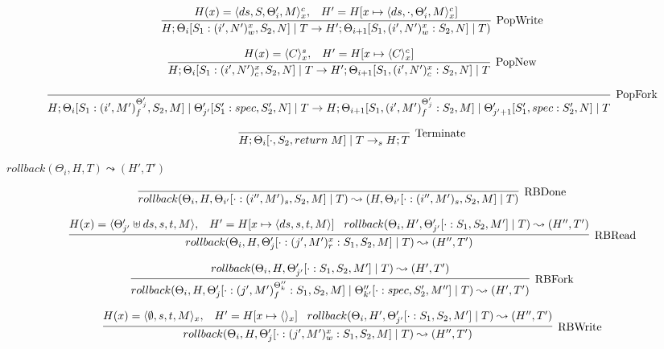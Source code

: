 \documentclass[9pt]{article}
\newcommand\specStep{\rightarrow_{s}}
\begin{document}
\[%
\infer[\text{PopWrite}]{H; \Theta_i[S_1: (i', N')_w^x, S_2, N] \; | \; T \rightarrow H'; \Theta_{i+1}[S_1, (i', N')_w^x : S_2, N] \; | \; T)}{H(x) = \langle ds, S, \Theta_i', M\rangle_x^c, \;\;\; H' = H[x \mapsto \langle ds, \cdot, \Theta_i', M\rangle_x^c]}
\]

\[%
\infer[\text{PopNew}]{H; \Theta_i[S_1 : (i', N')_c^x, S_2, N] \; | \; T \rightarrow H';  \Theta_{i+1}[S_1, (i', N')_c^x : S_2, N] \; | \; T}{H(x) = \langle C \rangle_x^s, \;\;\; H' = H[x \mapsto \langle C\rangle_x^c]}
\]

\[%
\infer[\text{PopFork}]{H; \Theta_i[S_1 : (i', M')_f^{\Theta_j'}, S_2, M] \; | \; \Theta_{j'}'[S_1' : spec, S_2', N] \; | \; T \rightarrow H; \Theta_{i+1}[S_1, (i', M')_f^{\Theta_j'} : S_2, M] \; | \; \Theta_{j' + 1}'[S_1', spec : S_2', N] \; | \; T}{}
\]

\[
\infer[\text{Terminate}]{H; \Theta_i[\cdot, S_2, return \; M] \; | \; T \specStep H; T}{}
\]

$\boxed{rollback(\Theta_i, H, T) \leadsto (H' ,T')}$

\[%
\infer[\text{RBDone}]{rollback(\Theta_i, H, \Theta_{i'}[\cdot : (i'', M')_s, S_2, M] \; | \; T) \leadsto (H, \Theta_{i'}[\cdot : (i'', M')_s, S_2, M] \; | \; T)}{}
\]

\[%
\infer[\text{RBRead}]{rollback(\Theta_i, H, \Theta_j'[\cdot : (j', M')_r^x : S_1, S_2, M] \; | \; T) \leadsto (H'', T')}{H(x) = \langle \Theta_{j'}' \uplus ds, s, t, M\rangle, \;\;\; H' = H[x \mapsto \langle ds, s, t, M\rangle] \;\;\; rollback(\Theta_i, H', \Theta_{j'}'[\cdot : S_1, S_2, M'] \; | \; T) \leadsto (H'', T')}
\]

\[%
\infer[\text{RBFork}]{rollback(\Theta_i, H, \Theta_j'[\cdot : (j', M')_f^{\Theta_k''} : S_1, S_2, M] \; | \; \Theta_{k'}''[\cdot : spec, S_2', M''] \; | \; T) \leadsto (H', T')}{rollback(\Theta_i, H, \Theta_{j'}'[\cdot : S_1, S_2, M'] \; | \; T) \leadsto (H', T')}
\]

\[%
\infer[\text{RBWrite}]{rollback(\Theta_i, H, \Theta_j'[\cdot : (j', M')_w^x : S_1, S_2, M] \; | \; T) \leadsto (H'', T')}{H(x) = \langle \emptyset, s, t, M\rangle_x, \;\;\; H' = H[x \mapsto \langle\rangle_x] \;\;\; rollback(\Theta_i, H', \Theta_{j'}'[\cdot : S_1, S_2, M'] \; | \; T) \leadsto (H'', T')}
\]
\end{document}
